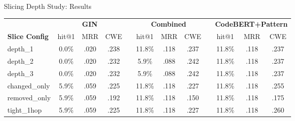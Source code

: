 \documentclass[aspectratio=169,10pt]{beamer}
\newcommand{\chit}[1]{\cellcolor{hit!30} #1}
\newcommand{\cmiss}[1]{\cellcolor{miss!25} #1}
\newcommand{\cwarn}[1]{\cellcolor{warn!30} #1}
\begin{document}
\begin{frame}{Slicing Depth Study: Results}

  \centering
  \vspace{0.1em}
  {\scriptsize
  \renewcommand{\arraystretch}{1.25}
  \setlength{\tabcolsep}{3pt}
  \begin{tabular}{l *{3}{c} c *{3}{c} c *{3}{c}}
    \toprule
    & \multicolumn{3}{c}{\textbf{GIN}}
    && \multicolumn{3}{c}{\textbf{Combined}}
    && \multicolumn{3}{c}{\textbf{CodeBERT+Pattern}} \\
    \cmidrule{2-4} \cmidrule{6-8} \cmidrule{10-12}
    \textbf{Slice Config}
      & hit@1 & MRR & CWE
      && hit@1 & MRR & CWE
      && hit@1 & MRR & CWE \\
    \midrule
    depth\_1
      & \cmiss{0.0\%} & .020 & .238
      && 11.8\% & .118 & .237
      && 11.8\% & .118 & .237 \\
    depth\_2
      & \cmiss{0.0\%} & .020 & .232
      && 5.9\% & .088 & .242
      && 11.8\% & .118 & .237 \\
    depth\_3
      & \cmiss{0.0\%} & .020 & .232
      && 5.9\% & .088 & .242
      && 11.8\% & .118 & .237 \\
    changed\_only
      & 5.9\% & .059 & .225
      && 11.8\% & .118 & .227
      && 11.8\% & .118 & \cwarn{.255} \\
    \rowcolor{c1!8}
    removed\_only
      & 5.9\% & .059 & .192
      && 11.8\% & .118 & .150
      && 11.8\% & .118 & .175 \\
    tight\_1hop
      & 5.9\% & .059 & .225
      && 11.8\% & .118 & .227
      && 11.8\% & .118 & \chit{.260} \\
    \bottomrule
  \end{tabular}}


\end{frame}
\end{document}
